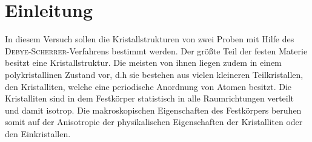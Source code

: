 

\section{Einleitung}

In diesem Versuch sollen die Kristallstrukturen von zwei Proben mit Hilfe
des \textsc{Debye-Scherrer}-Verfahrens bestimmt werden. Der größte Teil der
festen Materie besitzt eine Kristallstruktur. Die meisten von ihnen liegen
zudem in einem polykristallinen Zustand vor, d.h sie bestehen aus vielen
kleineren Teilkristallen, den Kristalliten, welche eine periodische
Anordnung von Atomen besitzt. Die Kristalliten sind in dem Festkörper
statistisch in alle Raumrichtungen verteilt und damit isotrop.
Die makroskopischen Eigenschaften des Festkörpers beruhen somit auf der
Anisotropie der physikalischen Eigenschaften der Kristalliten oder den
Einkristallen.
